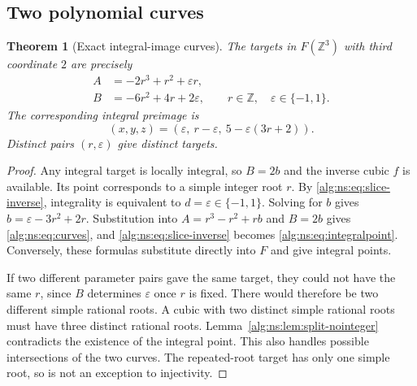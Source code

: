 \documentclass[11pt]{article}
\numberwithin{equation}{section}
\newtheorem{theorem}{Theorem}[section]
\theoremstyle{plain}
\theoremstyle{plain}
\theoremstyle{plain}
\theoremstyle{definition}
\theoremstyle{definition}
\theoremstyle{definition}
\theoremstyle{remark}
\newcommand{\Z}{\mathbb Z}\newcommand{\Q}{\mathbb Q}
\begin{document}
\subsection{Two polynomial curves}
\begin{theorem}[Exact integral-image curves]\label{alg:ns:thm:curves}
The targets in $F(\Z^3)$ with third coordinate $2$ are precisely
\begin{equation}\label{alg:ns:eq:curves}
\begin{aligned}
A&=-2r^3+r^2+\varepsilon r,\\
B&=-6r^2+4r+2\varepsilon,
\qquad r\in\Z,\quad\varepsilon\in\{-1,1\}.
\end{aligned}
\end{equation}
The corresponding integral preimage is
\begin{equation}\label{alg:ns:eq:integralpoint}
(x,y,z)=(\varepsilon,\ r-\varepsilon,\ 5-\varepsilon(3r+2)).
\end{equation}
Distinct pairs $(r,\varepsilon)$ give distinct targets.
\end{theorem}
\begin{proof}
Any integral target is locally integral, so $B=2b$ and the inverse cubic
$f$ is available. Its point corresponds to a simple integer root $r$.
By \eqref{alg:ns:eq:slice-inverse}, integrality is equivalent to
$d=\varepsilon\in\{-1,1\}$. Solving for $b$ gives
$b=\varepsilon-3r^2+2r$. Substitution into
$A=r^3-r^2+rb$ and $B=2b$ gives \eqref{alg:ns:eq:curves}, and
\eqref{alg:ns:eq:slice-inverse} becomes \eqref{alg:ns:eq:integralpoint}. Conversely,
these formulas substitute directly into $F$ and give integral points.

If two different parameter pairs gave the same target, they could not
have the same $r$, since $B$ determines $\varepsilon$ once $r$ is fixed.
There would therefore be two different simple rational roots. A cubic
with two distinct simple rational roots must have three distinct
rational roots. Lemma~\ref{alg:ns:lem:split-nointeger} contradicts the existence
of the integral point. This also handles possible intersections of the
two curves. The repeated-root target has only one simple root, so is
not an exception to injectivity.
\end{proof}
\end{document}
